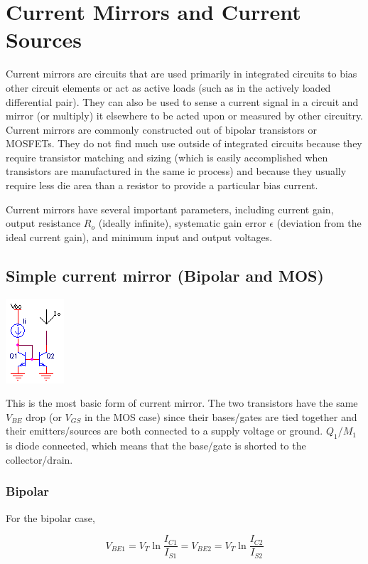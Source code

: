 \chapter{Current Mirrors and Current Sources}
Current mirrors are circuits that are used primarily in integrated circuits to bias other circuit elements or act as active loads (such as in the actively loaded differential pair).
They can also be used to sense a current signal in a circuit and mirror (or multiply) it elsewhere to be acted upon or measured by other circuitry.
Current mirrors are commonly constructed out of bipolar transistors or MOSFETs.
They do not find much use outside of integrated circuits because they require transistor matching and sizing (which is easily accomplished when transistors are manufactured in the same \ac{ic} process) and because they usually require less die area than a resistor to provide a particular bias current.

Current mirrors have several important parameters, including current gain, output resistance $R_{o}$ (ideally infinite), systematic gain error $\epsilon$ (deviation from the ideal current gain), and minimum input and output voltages.

\section{Simple current mirror (Bipolar and MOS)}
\begin{center}
	\includegraphics{schematics/simplecurrentmirror.PNG}
\end{center}
This is the most basic form of current mirror.
The two transistors have the same $V_{BE}$ drop (or $V_{GS}$ in the MOS case) since their bases/gates are tied together and their emitters/sources are both connected to a supply voltage or ground.
$Q_1$/$M_1$ is diode connected, which means that the base/gate is shorted to the collector/drain.
\subsection{Bipolar}
For the bipolar case,

\begin{equation}
V_{BE1} = V_{T}\ln\frac{I_{C1}}{I_{S1}} = V_{BE2} = V_{T}\ln\frac{I_{C2}}{I_{S2}}
\end{equation}

